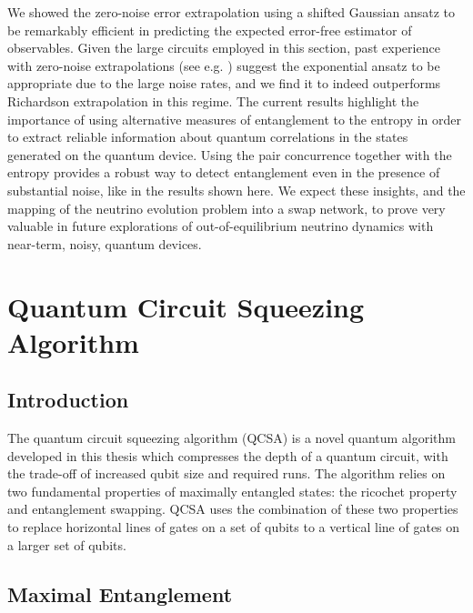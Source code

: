\documentclass[Dual]{msu-thesis}
\begin{document}
We showed the zero-noise error extrapolation using a shifted Gaussian ansatz to be remarkably efficient in predicting the expected error-free estimator of observables. Given the large circuits employed in this section, past experience with zero-noise extrapolations (see e.g. \cite{roggero2020A,Roggero_nptodg}) suggest the exponential ansatz to be appropriate due to the large noise rates, and we find it to indeed outperforms Richardson extrapolation in this regime. The current results highlight the importance of using alternative measures of entanglement to the entropy in order to extract reliable information about quantum correlations in the states generated on the quantum device. Using the pair concurrence together with the entropy provides a robust way to detect entanglement even in the presence of substantial noise, like in the results shown here. We expect these insights, and the mapping of the neutrino evolution problem into a swap network, to prove very valuable in future explorations of out-of-equilibrium neutrino dynamics with near-term, noisy, quantum devices.

\chapter{Quantum Circuit Squeezing Algorithm}
\label{chap:qcsa}

\section{Introduction}

The quantum circuit squeezing algorithm (QCSA) is a novel quantum algorithm developed in this thesis which compresses the depth of a quantum circuit, with the trade-off of increased qubit size and required runs. The algorithm relies on two fundamental properties of maximally entangled states: the ricochet property and entanglement swapping. QCSA uses the combination of these two properties to replace horizontal lines of gates on a set of qubits to a vertical line of gates on a larger set of qubits.

\section{Maximal Entanglement}
\end{document}
